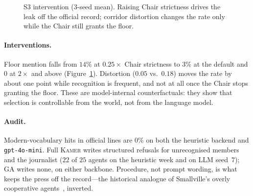 \documentclass[sigconf,review,anonymous]{acmart}
\newcommand{\sys}{\textsc{Kamer}}
\begin{document}
\begin{figure}[t]
\centering
{}
\caption{S3 intervention (3-seed mean). Raising Chair strictness drives
the leak off the official record; corridor distortion changes the rate
only while the Chair still grants the floor.}
\label{fig:cf}
\end{figure}

\paragraph{Interventions.} Floor mention falls from $14\%$ at
$0.25\times$ Chair strictness to $3\%$ at the default and $0$ at
$2\times$ and above (Figure~\ref{fig:cf}). Distortion ($0.05$ vs.\
$0.18$) moves the rate by about one point while recognition is frequent,
and not at all once the Chair stops granting the floor. These are
model-internal counterfactuals: they show that selection is controllable
from the world, not from the language model.

\paragraph{Audit.} Modern-vocabulary hits in official lines are $0\%$ on
both the heuristic backend and \texttt{gpt-4o-mini}. Full \sys{} writes
structured refusals for unrecognised members and the journalist ($22$ of
$25$ agents on the heuristic week and on LLM seed~7); GA writes none, on
either backbone. Procedure,
not prompt wording, is what keeps the press off the record---the
historical analogue of Smallville's overly cooperative
agents~\cite{park2023generative}, inverted.
\end{document}
